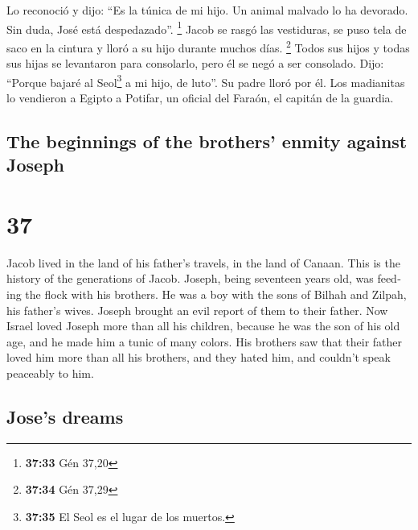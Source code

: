 \begin{paracol}{2}
 Lo reconoció y dijo: ``Es la túnica de mi hijo. Un
animal malvado lo ha devorado. Sin duda, José está despedazado''.
\footnote{\textbf{37:33} Gén 37,20}  Jacob se rasgó las
vestiduras, se puso tela de saco en la cintura y lloró a su hijo durante
muchos días. \footnote{\textbf{37:34} Gén 37,29}  Todos
sus hijos y todas sus hijas se levantaron para consolarlo, pero él se
negó a ser consolado. Dijo: ``Porque bajaré al Seol\footnote{\textbf{37:35}
  El Seol es el lugar de los muertos.} a mi hijo, de luto''. Su padre
lloró por él.  Los madianitas lo vendieron a Egipto a
Potifar, un oficial del Faraón, el capitán de la guardia.

\switchcolumn
\begin{otherlanguage}{english}

\hypertarget{the-beginnings-of-the-brothers-enmity-against-joseph}{%
\subsection{The beginnings of the brothers' enmity against
Joseph}\label{the-beginnings-of-the-brothers-enmity-against-joseph}}

\hypertarget{section-73}{%
\section{37}\label{section-73}}

 Jacob lived in the land of his father's travels, in the
land of Canaan.  This is the history of the generations of
Jacob. Joseph, being seventeen years old, was feeding the flock with his
brothers. He was a boy with the sons of Bilhah and Zilpah, his father's
wives. Joseph brought an evil report of them to their father.
 Now Israel loved Joseph more than all his children,
because he was the son of his old age, and he made him a tunic of many
colors.  His brothers saw that their father loved him more
than all his brothers, and they hated him, and couldn't speak peaceably
to him.

\hypertarget{joses-dreams}{%
\subsection{Jose's dreams}\label{joses-dreams}}


\end{otherlanguage}
\end{paracol}
